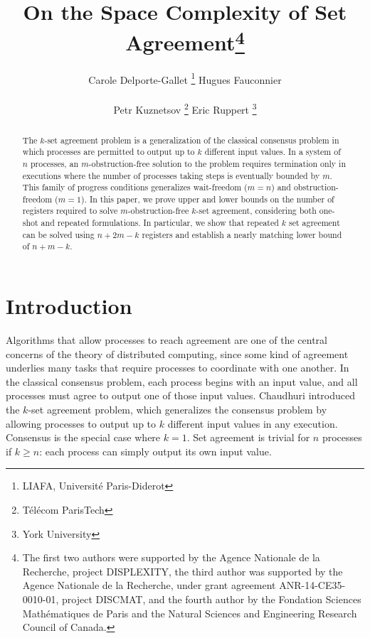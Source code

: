 \documentclass[11pt]{article}
\newcounter{ind}
\begin{document}
\sloppy


\title{On the Space Complexity of Set Agreement\thanks{The first two authors were supported by  the Agence Nationale de la Recherche, project
DISPLEXITY, the third author was
    supported by the Agence Nationale de la Recherche,  under
  grant agreement ANR-14-CE35-0010-01, project DISCMAT, and the fourth author
  by the Fondation Sciences
    Math\'e\-ma\-tiques de Paris and the Natural Sciences and
    Engineering Research Council of Canada.}}

\author{
Carole Delporte-Gallet
\protect\footnote{LIAFA, Universit\'e Paris-Diderot} 
\hspace{1cm}
Hugues Fauconnier
\protect\footnotemark[2]
\\
\\
Petr Kuznetsov
\protect\footnote{T\'el\'ecom ParisTech} 
\hspace{1cm}
Eric Ruppert
\protect\footnote{York University}
}

\date{}

\maketitle

\begin{abstract}
The $k$-set agreement problem is a generalization of the classical consensus 
problem in which processes are permitted to output up to $k$ different
input values.
In a system of $n$ processes, an $m$-obstruction-free solution to the problem 
requires termination only in executions where the number of processes taking 
steps is eventually bounded by $m$.
This family of progress conditions generalizes wait-freedom ($m=n$) 
and obstruction-freedom ($m=1$).
In this paper, we prove upper and lower bounds on the 
number of registers required to solve $m$-obstruction-free 
$k$-set agreement, considering both one-shot and repeated formulations.
In particular, we show that repeated $k$ set agreement can be solved using
$n+2m-k$ registers and establish a nearly matching lower bound of $n+m-k$.
\end{abstract}




\section{Introduction}
\indent

Algorithms that allow processes to reach
agreement are one of the central concerns of the theory of
distributed computing, since some kind of 
agreement underlies many tasks that require
processes to coordinate with one another.
In the classical consensus problem, each process begins with an input
value, and all processes must agree to output one of those input values.
Chaudhuri \cite{Cha93} introduced the $k$-set agreement problem, which
generalizes the consensus problem by
allowing processes to output up to $k$ different input values in any execution.
Consensus is the special case where $k=1$.
Set agreement is trivial for $n$ processes if $k\geq n$:
each process can simply output its own input value.
\end{document}
